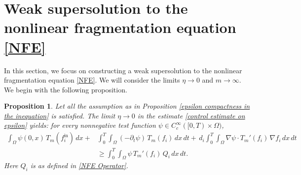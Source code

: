 \documentclass[a4paper,12pt,reqno]{amsart}
\theoremstyle{plain}
\newtheorem{prop}[thm]{Proposition}
\numberwithin{equation}{section}
\begin{document}
	
	\section{Weak supersolution to the nonlinear fragmentation equation \eqref{NFE}} \label{EWSNFE}
	
	In this section, we focus on constructing a weak supersolution to the nonlinear
	fragmentation equation \eqref{NFE}. We will consider the limits $\eta \to 0$ and
	$m \to \infty$. We begin with the following proposition.
	\begin{prop}\label{eta to zero}
		Let all the assumption as in Proposition \ref{epsilon compactness in the inequation} is satisfied. The limit $\eta\to 0$ in the estimate \eqref{control estimate on epsilon} yields: for every
		nonnegative test function $\psi \in C_c^\infty([0,T)\times\Omega)$,
		\begin{align}\label{control on eta}
			\int_\Omega \psi(0,x)\,T_m(f_i^{\mathrm{in}})\,dx
			+&
			\int_0^T\!\!\int_\Omega
			(-\partial_t\psi)\,T_m(f_i)\,dx\,dt
			+\, d_i \int_0^T\!\!\int_\Omega
			\nabla\psi \cdot  T_m'(f_i)\,\nabla f_i
			\,dx\,dt \nonumber
			\\
			&\ge
			\int_0^T\!\!\int_\Omega
			\psi\,T_m'(f_i)\,Q_i
			\,dx\,dt.
		\end{align}
		Here $Q_i$ is as defined in \eqref{NFE Operator}.
	\end{prop}
\end{document}
